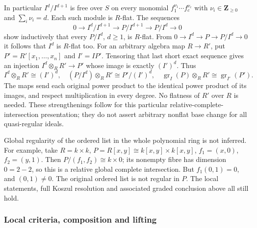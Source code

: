 In particular \(I^d/I^{d+1}\) is free over \(S\) on every monomial \(f_1^{\nu_1}\cdots f_c^{\nu_c}\) with \(\nu_i\in\mathbf Z_{\ge0}\) and \(\sum_i\nu_i=d\). Each such module is \(R\)-flat. The sequences \[
0\longrightarrow I^d/I^{d+1}\longrightarrow P/I^{d+1}\longrightarrow P/I^d\longrightarrow0
\] show inductively that every \(P/I^d\), \(d\ge1\), is \(R\)-flat. From \(0\to I^d\to P\to P/I^d\to0\) it follows that \(I^d\) is \(R\)-flat too. For an arbitrary algebra map \(R\to R'\), put \(P'=R'[x_1,\ldots,x_n]\) and \(I'=IP'\). Tensoring that last short exact sequence gives an injection \(I^d\otimes_R R'\to P'\) whose image is exactly \((I')^d\). Thus \[
I^d\otimes_R R'\cong(I')^d,\quad
(P/I^d)\otimes_R R'\cong P'/(I')^d,\quad
\operatorname{gr}_I(P)\otimes_R R'\cong\operatorname{gr}_{I'}(P').
\] The maps send each original power product to the identical power product of its images, and respect multiplication in every degree. No flatness of \(R'\) over \(R\) is needed. These strengthenings follow for this particular relative-complete-intersection presentation; they do not assert arbitrary nonflat base change for all quasi-regular ideals.

Global regularity of the ordered list in the whole polynomial ring is not inferred. For example, take \(R=k\times k\), \(P=R[x,y]\cong k[x,y]\times k[x,y]\), \(f_1=(x,0)\), \(f_2=(y,1)\). Then \(P/(f_1,f_2)\cong k\times0\); its nonempty fibre has dimension \(0=2-2\), so this is a relative global complete intersection. But \(f_1(0,1)=0\), and \((0,1)\ne0\). The original ordered list is not regular in \(P\). The local statements, full Koszul resolution and associated graded conclusion above all still hold.

\subsubsection{Local criteria, composition and lifting}\label{local-criteria-composition-and-lifting}

